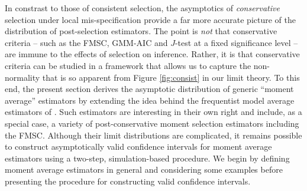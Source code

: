 \documentclass[12pt]{article}
\theoremstyle{definition}
\begin{document}
In constrast to those of consistent selection, the asymptotics of \emph{conservative} selection  under local mis-specification provide a far more accurate picture of the distribution of post-selection estimators.
The point is \emph{not} that conservative criteria -- such as the FMSC, GMM-AIC and $J$-test at a fixed significance level -- are immune to the effects of selection on inference.
Rather, it is that conservative criteria can be studied in a framework that allows us to capture the non-normality that is so apparent from Figure \ref{fig:consist} in our limit theory.  
To this end, the present section derives the asymptotic distribution of generic ``moment average'' estimators by extending the idea behind the frequentist model average estimators of \cite{HjortClaeskens}. 
Such estimators are interesting in their own right and include, as a special case, a variety of post-conservative moment selection estimators including the FMSC.
Although their limit distributions are complicated, it remains possible to construct asymptotically valid confidence intervals for moment average estimators using a two-step, simulation-based procedure.
We begin by defining moment average estimators in general and considering some examples before presenting the procedure for constructing valid confidence intervals.
\end{document}
